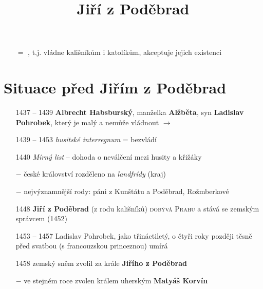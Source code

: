\documentclass{article}
\title{\vspace{-2cm}Jiří z Poděbrad\vspace{-1.7cm}}
\date{}
\author{}
\begin{document}
\maketitle

\begin{itemize}
    \vspace{-0.5em}
    \setlength\itemsep{0.15em}
    \item[$=$] , t.j. vládne kališníkům i katolíkům, akceptuje jejich existenci
\end{itemize}

\section*{Situace před Jiřím z Poděbrad}
\begin{itemize}
    \vspace{-0.5em}
    \setlength\itemsep{0.15em}
    \item[1437 -- 1439] \textbf{Albrecht Habsburský}, manželka \textbf{Alžběta}, syn \textbf{Ladislav Pohrobek}, který je malý a nemůže vládnout $\rightarrow$
    \item[1439 -- 1453] \textit{husitské interregnum} = bezvládí
    \item[1440] \textit{Mírný list} -- dohoda o neválčení mezi husity a křižáky
    \item[$-$] české království rozděleno na \textit{landfrídy} (kraj)
    \item[$-$] nejvýznamnější rody: páni z Kunštátu a Poděbrad, Rožmberkové
    \item[1448] \textbf{Jiří z Poděbrad} (z rodu kališníků) \textsc{dobývá Prahu} a stává se zemským správcem (1452)
    \item[1453 -- 1457] Ladislav Pohrobek, jako třináctiletý, o čtyři roky později těsně před svatbou (s francouzskou princeznou) umírá
    \item[1458] zemský sněm zvolil za krále \textbf{Jiřího z Poděbrad}
    \item[$-$] ve stejném roce zvolen králem uherským \textbf{Matyáš Korvín}
\end{itemize}
\end{document}
